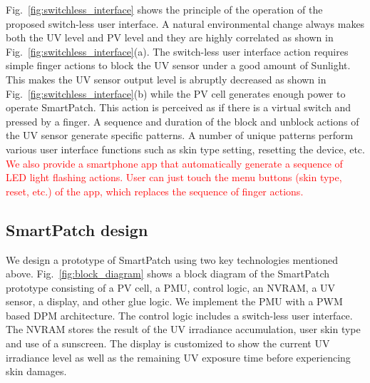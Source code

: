 \documentclass[journal]{IEEEtran}
\begin{document}
Fig.~\ref{fig:switchless_interface} shows the principle of the operation of the proposed switch-less user interface. A natural environmental change always makes both the UV level and PV level and they are highly correlated as shown in Fig.~\ref{fig:switchless_interface}(a). The switch-less user interface action requires simple finger actions to block the UV sensor under a good amount of Sunlight. This makes the UV sensor output level is abruptly decreased as shown in Fig.~\ref{fig:switchless_interface}(b) while the PV cell generates enough power to operate SmartPatch. This action is perceived as if there is a virtual switch and pressed by a finger. A sequence and duration of the block and unblock actions of the UV sensor generate specific patterns. A number of unique patterns perform various user interface functions such as skin type setting, resetting the device, etc. \textcolor{red}{We also provide a smartphone app that automatically generate a sequence of LED light flashing actions. User can just touch the  menu buttons (skin type, reset, etc.) of the app,  which replaces the sequence of finger actions.}

\subsection{SmartPatch design}

We design a prototype of SmartPatch using two key technologies mentioned above.
Fig.~\ref{fig:block_diagram} shows a block diagram of the SmartPatch prototype consisting of a PV cell, a PMU, control logic, an NVRAM, a UV sensor, a display, and other glue logic. We implement the PMU with a PWM based DPM architecture. The control logic includes a switch-less user interface. The NVRAM stores the result of the UV irradiance accumulation, user skin type and use of a sunscreen. The display is customized to show the current UV irradiance level as well as the remaining UV exposure time before experiencing skin damages.

%
\end{document}
